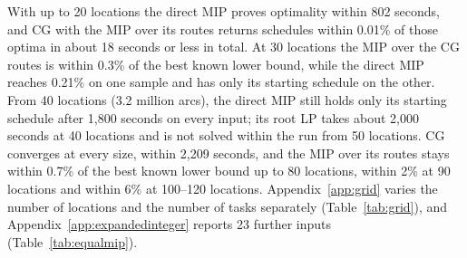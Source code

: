 With up to 20 locations the direct MIP proves optimality within 802 seconds, and CG with the MIP over its routes returns schedules within 0.01\% of those optima in about 18 seconds or less in total.
At 30 locations the MIP over the CG routes is within 0.3\% of the best known lower bound, while the direct MIP reaches 0.21\% on one sample and has only its starting schedule on the other.
From 40 locations (3.2 million arcs), the direct MIP still holds only its starting schedule after 1{,}800 seconds on every input; its root LP takes about 2{,}000 seconds at 40 locations and is not solved within the run from 50 locations.
CG converges at every size, within 2{,}209 seconds, and the MIP over its routes stays within 0.7\% of the best known lower bound up to 80 locations, within 2\% at 90 locations and within 6\% at 100--120 locations.
Appendix~\ref{app:grid} varies the number of locations and the number of tasks separately (Table~\ref{tab:grid}), and Appendix~\ref{app:expandedinteger} reports 23 further inputs (Table~\ref{tab:equalmip}).
